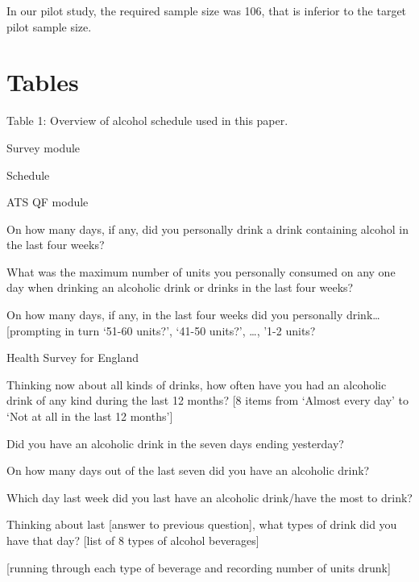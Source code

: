 \documentclass[]{article}
\begin{document}
In our pilot study, the required sample size was 106, that is inferior
to the target pilot sample size.

\hypertarget{tables}{%
\section{Tables}\label{tables}}

Table 1: Overview of alcohol schedule used in this paper.

Survey module

Schedule

ATS QF module

On how many days, if any, did you personally drink a drink containing
alcohol in the last four weeks?

What was the maximum number of units you personally consumed on any one
day when drinking an alcoholic drink or drinks in the last four weeks?

On how many days, if any, in the last four weeks did you personally
drink\ldots{} {[}prompting in turn `51-60 units?', `41-50 units?',
\ldots{}, '1-2 units?

Health Survey for England

Thinking now about all kinds of drinks, how often have you had an
alcoholic drink of any kind during the last 12 months? {[}8 items from
`Almost every day' to `Not at all in the last 12 months'{]}

Did you have an alcoholic drink in the seven days ending yesterday?

On how many days out of the last seven did you have an alcoholic drink?

Which day last week did you last have an alcoholic drink/have the most
to drink?

Thinking about last {[}answer to previous question{]}, what types of
drink did you have that day? {[}list of 8 types of alcohol beverages{]}

{[}running through each type of beverage and recording number of units
drunk{]}

\renewcommand\refname{References}

\end{document}
